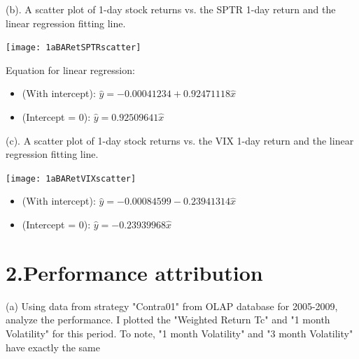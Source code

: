 \documentclass[11pt,letter]{article}
\begin{document}
(b). A scatter plot of 1-day stock returns vs. the SPTR 1-day return and the linear regression fitting line.
\begin{center}
\texttt{[image: 1aBARetSPTRscatter]}
\end{center}
Equation for linear regression:
\begin{itemize}
\item (With intercept): $ \hat{y} = -0.00041234 + 0.92471118 \hat{x}$
\item (Intercept = 0): $ \hat{y} = 0.92509641 \hat{x}$
\end{itemize}

(c). A scatter plot of 1-day stock returns vs. the VIX 1-day return and the linear regression fitting line.
\begin{center}
\texttt{[image: 1aBARetVIXscatter]}
\end{center}
\begin{itemize}
\item (With intercept): $ \hat{y} = -0.00084599 -0.23941314 \hat{x}$
\item (Intercept = 0): $ \hat{y} = -0.23939968 \hat{x}$
\end{itemize}


\section{2.Performance attribution}
(a) Using data from strategy "Contra01" from OLAP database for 2005-2009, analyze the performance. I plotted the "Weighted Return Tc" and "1 month Volatility" for this period. To note, "1 month Volatility" and "3 month Volatility" have exactly the same 
\end{document}
